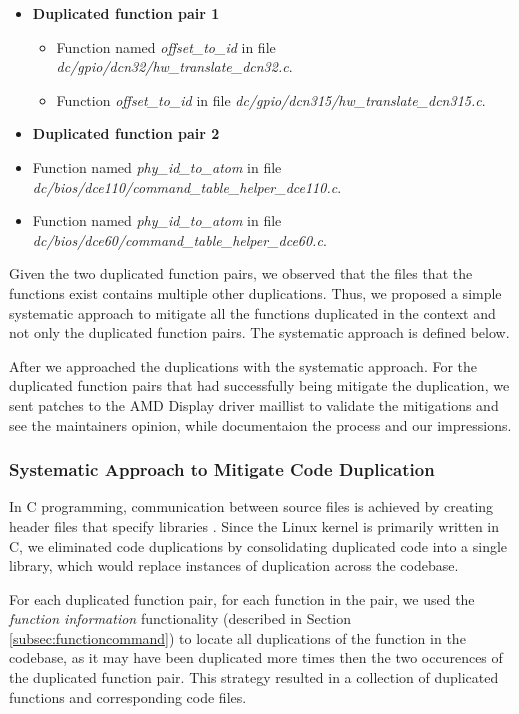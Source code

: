 \begin{itemize}
\item \textbf{Duplicated function pair 1}
\begin{itemize}
\item Function named \textit{offset\_to\_id} in file \textit{dc/gpio/dcn32/hw\_translate\_dcn32.c}.
\item Function \textit{offset\_to\_id} in file \textit{dc/gpio/dcn315/hw\_translate\_dcn315.c}.
\end{itemize}
\item \textbf{Duplicated function pair 2}
\item Function named \textit{phy\_id\_to\_atom} in file \textit{dc/bios/dce110/command\_table\_helper\_dce110.c}.
\item Function named \textit{phy\_id\_to\_atom} in file \textit{dc/bios/dce60/command\_table\_helper\_dce60.c}.
\end{itemize}

Given the two duplicated function pairs, we observed that the files that the functions exist contains 
multiple other duplications. Thus, we proposed a simple systematic approach to mitigate all the 
functions duplicated in the context and not only the duplicated function pairs. 
The systematic approach is defined below.

After we approached the duplications with the systematic approach. For the duplicated function
pairs that had successfully being mitigate the duplication, we sent patches to the AMD Display driver
maillist to validate the mitigations and see the maintainers opinion, while documentaion the process 
and our impressions.

\subsubsection{Systematic Approach to Mitigate Code Duplication}
\label{subsubsec:systematic}

In C programming, communication between source files is achieved by creating header files that specify 
libraries \citep{Cbook}. Since the Linux kernel is primarily written in C, we eliminated code duplications 
by consolidating duplicated code into a single library, which would replace instances of 
duplication across the codebase.

For each duplicated function pair, for each function in the pair, we used the \textit{function information} functionality 
(described in Section \ref{subsec:functioncommand}) to locate all duplications of the function in the codebase, 
as it may have been duplicated more times then the two occurences of the duplicated function pair. 
This strategy resulted in a collection of duplicated functions and corresponding code files.

